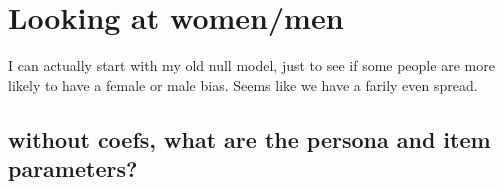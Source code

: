 \documentclass[
  man]{apa7}
\begin{document}
\hypertarget{looking-at-womenmen}{%
\section{Looking at women/men}\label{looking-at-womenmen}}

I can actually start with my old null model, just to see if some people are more likely to have a female or male bias. Seems like we have a farily even spread.

\hypertarget{without-coefs-what-are-the-persona-and-item-parameters}{%
\subsection{without coefs, what are the persona and item parameters?}\label{without-coefs-what-are-the-persona-and-item-parameters}}
\end{document}
